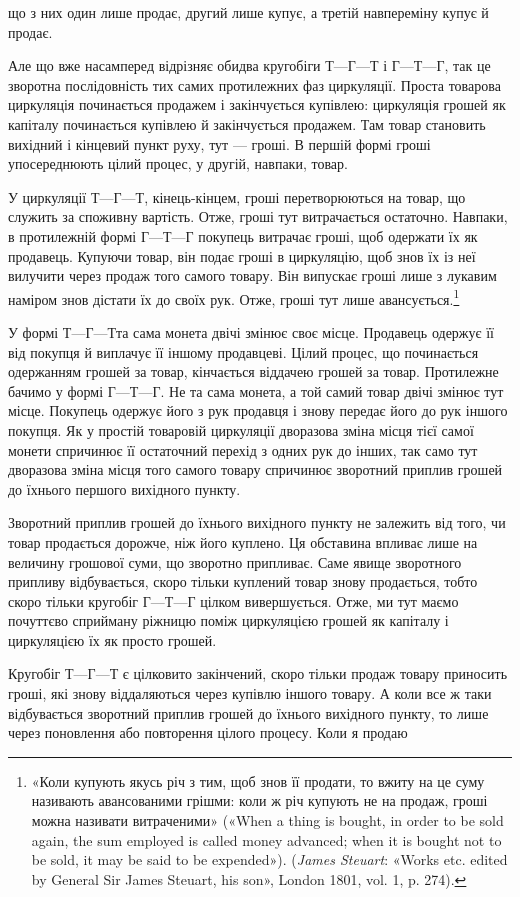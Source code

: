 \parcont{}  %
що з них один лише продає, другий лише купує, а третій навпереміну
купує й продає.

Але що вже насамперед відрізняє обидва кругобіги $Т — Г — Т$
і $Г — Т — Г$, так це зворотна послідовність тих самих протилежних
фаз циркуляції. Проста товарова циркуляція починається
продажем і закінчується купівлею: циркуляція грошей як капіталу
починається купівлею й закінчується продажем. Там
товар становить вихідний і кінцевий пункт руху, тут — гроші.
В першій формі гроші упосереднюють цілий процес, у другій,
навпаки, товар.

У циркуляції $Т — Г — Т$, кінець-кінцем, гроші перетворюються
на товар, що служить за споживну вартість. Отже, гроші
тут витрачається остаточно. Навпаки, в протилежній формі
$Г — Т — Г$ покупець витрачає гроші, щоб одержати їх як продавець.
Купуючи товар, він подає гроші в циркуляцію, щоб
знов їх із неї вилучити через продаж того самого товару. Він
випускає гроші лише з лукавим наміром знов дістати їх до своїх
рук. Отже, гроші тут лише авансується.\footnote{
«Коли купують якусь річ з тим, щоб знов її продати, то вжиту
на це суму називають авансованими грішми: коли ж річ купують не
на продаж, гроші можна називати витраченими» («When a thing is bought,
in order to be sold again, the sum employed is called money advanced;
when it is bought not to be sold, it may be said to be expended»). (\emph{James
Steuart}: «Works etc. edited by General Sir James Steuart, his son», London
1801, vol. 1, p. 274).
}

У формі $Т — Г — Т т$а сама монета двічі змінює своє місце.
Продавець одержує її від покупця й виплачує її іншому продавцеві.
Цілий процес, що починається одержанням грошей за товар,
кінчається віддачею грошей за товар. Протилежне бачимо у
формі $Г — Т — Г$. Не та сама монета, а той самий товар двічі
змінює тут місце. Покупець одержує його з рук продавця і знову
передає його до рук іншого покупця. Як у простій товаровій
циркуляції дворазова зміна місця тієї самої монети спричинює
її остаточний перехід з одних рук до інших, так само тут дворазова
зміна місця того самого товару спричинює зворотний приплив
грошей до їхнього першого вихідного пункту.

Зворотний приплив грошей до їхнього вихідного пункту не
залежить від того, чи товар продається дорожче, ніж його куплено.
Ця обставина впливає лише на величину грошової суми, що зворотно
припливає. Саме явище зворотного припливу відбувається,
скоро тільки куплений товар знову продається, тобто скоро
тільки кругобіг $Г — Т — Г$ цілком вивершується. Отже, ми тут
маємо почуттєво сприйману ріжницю поміж циркуляцією грошей
як капіталу і циркуляцією їх як просто грошей.

Кругобіг $Т — Г — Т$ є цілковито закінчений, скоро тільки
продаж товару приносить гроші, які знову віддаляються через
купівлю іншого товару. А коли все ж таки відбувається зворотний
приплив грошей до їхнього вихідного пункту, то лише через
поновлення або повторення цілого процесу. Коли я продаю
\parbreak{}  %

